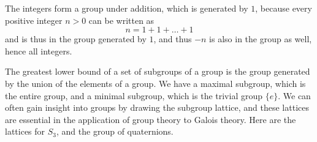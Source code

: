 \begin{example}
    The integers form a group under addition, which is generated by $1$, because every positive integer $n > 0$ can be written as
    \[ n = 1 + 1 + \dots + 1  \]
    and is thus in the group generated by $1$, and thus $-n$ is also in the group as well, hence all integers.
\end{example}

The greatest lower bound of a set of subgroups of a group is the group generated by the union of the elements of a group. We have a maximal subgroup, which is the entire group, and a minimal subgroup, which is the trivial group $\{ e \}$. We can often gain insight into groups by drawing the subgroup lattice, and these lattices are essential in the application of group theory to Galois theory. Here are the lattices for $S_3$, and the group of quaternions.

